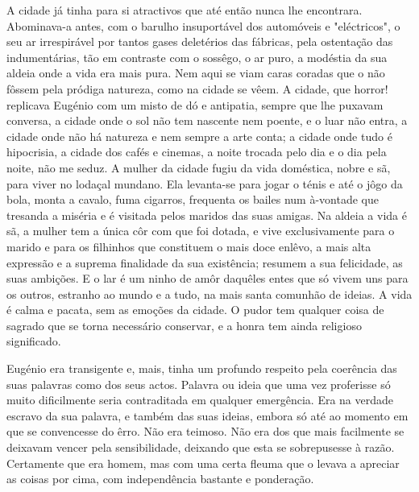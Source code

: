 \documentclass[9pt]{article}
\begin{document}
A cidade já tinha para si atractivos que até então nunca lhe encontrara. Abominava-a antes, com o baru\-lho insuportável dos automóveis
e "eléctricos", o seu ar irrespirável por tantos gases deletérios das
fá\-bri\-cas, pela ostenta\-ção das indumentárias, tão em contraste com o sossêgo, o ar puro, a modéstia da sua aldeia onde a vida era mais pura. Nem
aqui se viam caras coradas que o não fôssem pela pródiga natureza, como na cidade se vêem. A cidade, que horror! replicava Eugé\-nio com um
misto de dó e antipatia, sempre que lhe puxavam conversa, a cidade onde
o sol não tem nascente nem poente, e o luar não entra, a cidade onde
não há natureza e nem sempre a arte conta; a cidade onde tudo é hipocrisia, a cidade dos cafés e cinemas, a noite trocada pelo dia e o dia
pela noite, não me seduz. A mu\-lher da cidade fugiu da vida doméstica,
nobre e sã, para viver no lodaçal mundano. Ela levanta-se para jogar
o ténis e até o jôgo da bola, monta a cavalo, fuma cigarros, frequenta
os bailes num à-vontade que tresanda a miséria e é visitada pelos maridos das suas amigas. Na aldeia a vida é sã, a mu\-lher tem a única côr
com que foi dotada, e vive exclusivamente para o marido e para os fi\-lhinhos que constituem o mais doce enlêvo, a mais alta ex\-pres\-são e a
suprema finalidade da sua exis\-tên\-cia; resumem a sua felicidade, as suas
ambi\-ções. E o lar é um ninho de amôr da\-quê\-les entes que só vivem uns
para os outros, estranho ao mundo e a tudo, na mais santa comunhão de
ideias. A vida é calma e pacata, sem as emo\-ções da cidade. O pudor tem
qualquer coisa de sagrado que se torna necessário conservar, e a honra
tem ainda religioso signifi\-cado.

Eugé\-nio era transigente e, mais, tinha um profundo respeito pela
coerência das suas palavras como dos seus actos. Palavra ou ideia que
uma vez proferisse só muito dificilmente seria contraditada em qualquer emergência. Era na verdade escravo da sua palavra, e também das
suas ideias, embora só até ao momento em que se convencesse do êrro.
Não era teimoso. Não era dos que mais facilmente se deixavam vencer
pela sensibilidade, deixando que esta se sobrepusesse à razão. Certamente que era homem, mas com uma certa fleuma que o levava a apreciar
as coisas por cima, com independên\-cia bastante e pondera\-ção.
\end{document}

